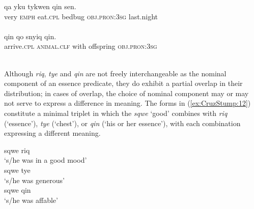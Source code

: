 \documentclass[output=paper]{langsci/langscibook}
\begin{document}
\begin{exe}

	\ex \label{ex:CruzStump:11}
			\ea \label{ex:CruzStump:11a} {{qa} } {{yku} } {{tykwen}} {{qin} } {{sen}.}\\
	 				{ {very}} {\textsc{emph}} {eat.\textsc{cpl}} {bedbug} {\textsc{obj.pron:3sg}} {last.night}\\
					\\
	 		\ex \label{ex:CruzStump:11b} {{qin}} {{qo}} {{snyiq}} {{qin}.}\\
	 				{ { arrive.\textsc{cpl}}} {\textsc{animal}.\textsc{clf}} {with} {offspring} {\textsc{obj.pron:3sg}}\\
					\\
	\z
\end{exe}

Although \emph{riq}, \emph{tye} and \emph{qin} are not freely interchangeable as the nominal component of an essence predicate, they do exhibit a partial overlap in their
distribution; in cases of overlap, the choice of nominal component may or may not serve to express a difference in meaning. The forms in (\ref{ex:CruzStump:12}) constitute a minimal triplet in which the
 \emph{sqwe} `good' combines with \emph{riq} (`essence'), \emph{tye} (`chest'), or \emph{qin} (`his or her essence'), with each
combination expressing a different meaning.

\begin{exe}
	\ex \label{ex:CruzStump:12}
		\ea\label{ex:CruzStump:12a} {sqwe} {riq}\\
		\glt `s/he was in a good mood'\\
		\ex\label{ex:CruzStump:12b} {sqwe} {tye}\\
		\glt `s/he was generous'\\
		\ex\label{ex:CruzStump:12c} {sqwe} {qin}\\
		\glt `s/he was affable'\\
		\z
\end{exe}
\end{document}
